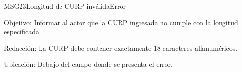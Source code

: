 \begin{mensaje}{MSG23}{Longitud de CURP inválida}{Error}
	\item [Objetivo:] Informar al actor que la CURP ingresada no cumple con la longitud especificada.
	\item[Redacción:] La CURP debe contener exactamente 18 caracteres alfanuméricos.
	\item [Ubicación:] Debajo del campo donde se presenta el error.
\end{mensaje}